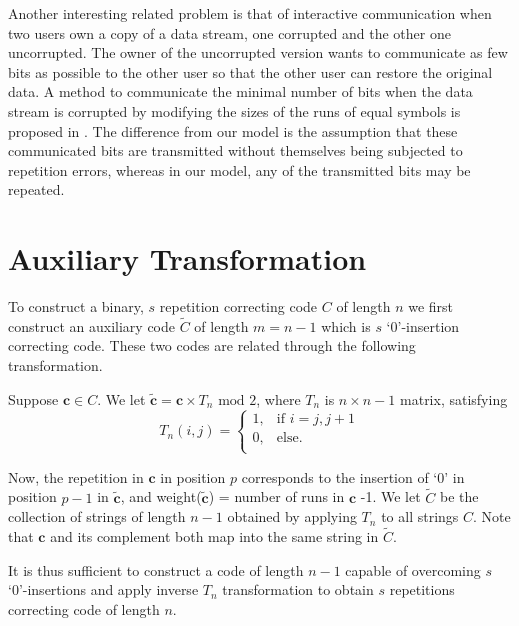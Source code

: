 Another interesting related problem is that of interactive
communication when two users own a copy of a data stream, one
corrupted and the other one uncorrupted. The owner of the
uncorrupted version wants to communicate as few bits as possible
to the other user so that the other user can restore the original
data. A method to communicate the minimal number of bits when the
data stream is corrupted by modifying the sizes of the runs of
equal symbols is proposed in \cite{orlitsky:93}. The difference
from our model is the assumption that these communicated bits are
transmitted without themselves being subjected to repetition
errors, whereas in our model, any of the transmitted bits may be
repeated.



\section{Auxiliary Transformation}\label{aux2a}


To construct a binary, $s$ repetition correcting code $C$ of
length $n$ we first construct an auxiliary code $\tilde{C}$ of
length $m=n-1$ which is $s$ `0'-insertion correcting code. These
two codes are related through the following transformation.


Suppose $\mathbf{c} \in C$. We let $\mathbf{\tilde{c}}= \mathbf{c}
\times T_n \text{ mod } 2$, where $T_n$ is $n \times n-1$ matrix,
satisfying\vspace{-0.0in}\begin{equation}\label{eq:t}T_{n}(i,j)=\left\{
\begin{array}{lll}
    1, & \text{if }i = j,j+1\\
    0, & \text{else.} \\
\end{array} \right. \end{equation}


Now, the repetition in $\mathbf{c}$ in position $p$ corresponds to
the insertion of `0' in position $p-1$ in $\mathbf{\tilde{c}}$,
and weight($\mathbf{\tilde{c}}$) = number of runs in $\mathbf{c}$
-1. We let $\tilde{C}$ be the collection of strings of length
$n-1$ obtained by applying $T_n$ to all strings $C$. Note that
$\mathbf{c}$ and its complement both map into the same string in
$\tilde{C}$.

It is thus sufficient to construct a code of length $n-1$ capable
of overcoming $s$ `0'-insertions and apply inverse $T_n$
transformation to obtain $s$ repetitions correcting code of length
$n$.
